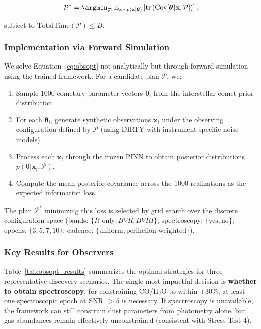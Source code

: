 \documentclass[preprint2]{aastex631}
\begin{document}
\begin{equation}\label{eq:obsopt}
\mathcal{P}^* = \argmin_{\mathcal{P}} \; \mathbb{E}_{\mathbf{x} \sim p(\mathbf{x}|\boldsymbol{\theta})}\left[\text{tr}\left(\text{Cov}[\boldsymbol{\theta} | \mathbf{x}, \mathcal{P}]\right)\right],
\end{equation}

subject to $\text{TotalTime}(\mathcal{P}) \leq B$.

\subsubsection{Implementation via Forward Simulation}

We solve Equation~\ref{eq:obsopt} not analytically but through forward simulation using the trained framework. For a candidate plan $\mathcal{P}$, we:

\begin{enumerate}
    \item Sample 1000 cometary parameter vectors $\boldsymbol{\theta}_i$ from the interstellar comet prior distribution.
    \item For each $\boldsymbol{\theta}_i$, generate synthetic observations $\mathbf{x}_i$ under the observing configuration defined by $\mathcal{P}$ (using DIRTY with instrument-specific noise models).
    \item Process each $\mathbf{x}_i$ through the frozen PINN to obtain posterior distributions $p(\boldsymbol{\theta} | \mathbf{x}_i, \mathcal{P})$.
    \item Compute the mean posterior covariance across the 1000 realizations as the expected information loss.
\end{enumerate}

The plan $\mathcal{P}^*$ minimizing this loss is selected by grid search over the discrete configuration space (bands: $\{R\text{-only}, BVR, BVRI\}$; spectroscopy: $\{\text{yes}, \text{no}\}$; epochs: $\{3, 5, 7, 10\}$; cadence: $\{\text{uniform}, \text{perihelion-weighted}\}$).

\subsubsection{Key Results for Observers}

Table~\ref{tab:obsopt_results} summarizes the optimal strategies for three representative discovery scenarios. The single most impactful decision is \textbf{whether to obtain spectroscopy}: for constraining CO/H$_2$O to within $\pm 30\%$, at least one spectroscopic epoch at SNR~$>5$ is necessary. If spectroscopy is unavailable, the framework can still constrain dust parameters from photometry alone, but gas abundances remain effectively unconstrained (consistent with Stress Test 4).
\end{document}
